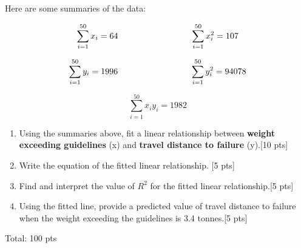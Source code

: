 \documentclass[11pt]{article}\usepackage[]{graphicx}\usepackage[]{color}
\begin{document}
\begin{enumerate}
Here are some summaries of the data:

$$
\sum_{i=1}^{50} x_i = 64 \hspace{3cm} \sum_{i=1}^{50} x_i^2 = 107 \\
$$

$$
\sum_{i=1}^{50} y_i = 1996 \hspace{3cm} \sum_{i=1}^{50} y_i^2 = 94078 \\
$$

$$
\sum_{i=1}^{50} x_i y_i = 1982
$$

\begin{enumerate}
       \item  Using the summaries above, fit a linear relationship between \textbf{weight exceeding guidelines} (x) and \textbf{travel distance to failure} (y).[10 pts]
   

      \item Write the equation of the fitted linear relationship. [5 pts] 
      \vspace{2cm}
      \item Find and interpret the value of $R^2$ for the fitted linear relationship.[5 pts]
      \vspace{2cm}
      \item Using the fitted line, provide a predicted value of travel distance to failure when the weight exceeding the guidelines is 3.4 tonnes.[5 pts]
      \vspace{2cm}

% 
% 
% 
% 

\end{enumerate}

\end{enumerate}	

Total: 100 pts
\end{document}
